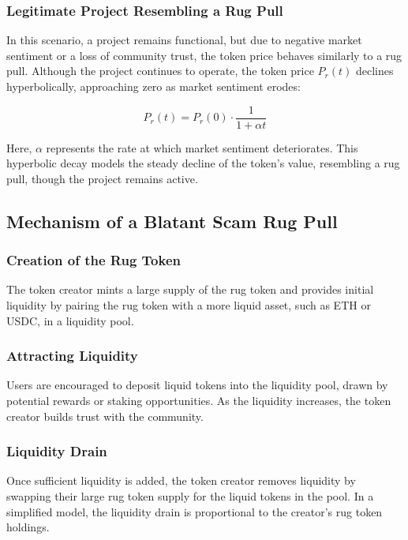 \documentclass{article}
\begin{document}
\subsubsection{Legitimate Project Resembling a Rug Pull}

In this scenario, a project remains functional, but due to negative market sentiment or a loss of community trust, the token price behaves similarly to a rug pull. Although the project continues to operate, the token price \( P_{r}(t) \) declines hyperbolically, approaching zero as market sentiment erodes:

\[
P_{r}(t) = P_{r}(0) \cdot \frac{1}{1 + \alpha t}
\]

Here, \( \alpha \) represents the rate at which market sentiment deteriorates. This hyperbolic decay models the steady decline of the token’s value, resembling a rug pull, though the project remains active.

\subsection{Mechanism of a Blatant Scam Rug Pull}

\subsubsection{Creation of the Rug Token} 

The token creator mints a large supply of the rug token and provides initial liquidity by pairing the rug token with a more liquid asset, such as ETH or USDC, in a liquidity pool.

\subsubsection{Attracting Liquidity} 

Users are encouraged to deposit liquid tokens into the liquidity pool, drawn by potential rewards or staking opportunities. As the liquidity increases, the token creator builds trust with the community.




\subsubsection{Liquidity Drain} 

Once sufficient liquidity is added, the token creator removes liquidity by swapping their large rug token supply for the liquid tokens in the pool. In a simplified model, the liquidity drain is proportional to the creator's rug token holdings.
\end{document}
